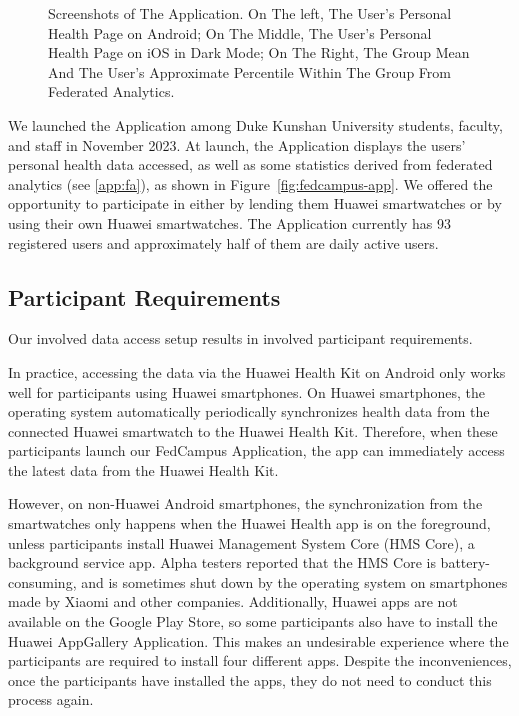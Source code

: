 \begin{figure}
\begin{center}
        \caption{Screenshots of The \fedcampus Application.
            On The left, The User's Personal Health Page on Android;
            On The Middle, The User's Personal Health Page on iOS in Dark Mode;
            On The Right,
            The Group Mean And The User's Approximate Percentile Within The
            Group From Federated Analytics.
        }
    \end{center}\end{figure}

We launched the \fedcampus Application among Duke Kunshan University students,
faculty, and staff in November 2023.
At launch,
the \fedcampus Application displays the users' personal health data accessed,
as well as some statistics derived from federated analytics (see \ref{app:fa}),
as shown in Figure~\ref{fig:fedcampus-app}.
We offered the opportunity to participate in \fedcampus either by lending them
Huawei smartwatches or by using their own Huawei smartwatches.
The \fedcampus Application currently has 93 registered users and approximately
half of them are daily active users.

\subsection{\fedcampus Participant Requirements}

Our involved data access setup results in involved participant requirements.

In practice, accessing the data via the Huawei Health Kit on Android only works
well for participants using Huawei smartphones.
On Huawei smartphones,
the operating system automatically periodically synchronizes health data from
the connected Huawei smartwatch to the Huawei Health Kit.
Therefore, when these participants launch our FedCampus Application,
the app can immediately access the latest data from the Huawei Health Kit.

However, on non-Huawei Android smartphones,
the synchronization from the smartwatches only happens when
the Huawei Health app is on the foreground,
unless participants install Huawei Management System Core (HMS Core),
a background service app.
Alpha testers reported that the HMS Core is battery-consuming,
and is sometimes shut down by the operating system on smartphones made by
Xiaomi and other companies.
Additionally, Huawei apps are not available on the Google Play Store,
so some participants also have to install the Huawei AppGallery Application.
This makes an undesirable experience where the participants are required to
install four different apps.
Despite the inconveniences, once the participants have installed the apps,
they do not need to conduct this process again.

